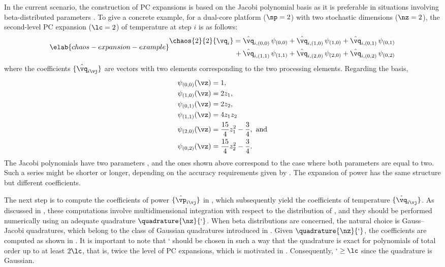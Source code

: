 In the current scenario, the construction of \ac{PC} expansions is based on the
Jacobi polynomial basis as it is preferable in situations involving
beta-distributed parameters \cite{xiu2010}. To give a concrete example, for a
dual-core platform ($\np = 2$) with two stochastic dimensions ($\nz = 2$), the
second-level \ac{PC} expansion ($\lc = 2$) of temperature at step $i$ is as
follows:
\begin{equation} \elab{chaos-expansion-example}
  \begin{split}
    \chaos{2}{2}{\vq_i}
    =    {} & \hat{\vq}_{i, (0, 0)} \, \psi_{(0, 0)} +
              \hat{\vq}_{i, (1, 0)} \, \psi_{(1, 0)} +
              \hat{\vq}_{i, (0, 1)} \, \psi_{(0, 1)} \\
    {} + {} & \hat{\vq}_{i, (1, 1)} \, \psi_{(1, 1)} +
              \hat{\vq}_{i, (2, 0)} \, \psi_{(2, 0)} +
              \hat{\vq}_{i, (0, 2)} \, \psi_{(0, 2)}
  \end{split}
\end{equation}
where the coefficients $\{ \hat{\vq}_{i \vj} \}$ are vectors with two elements
corresponding to the two processing elements. Regarding the basis,
\begin{align*}
  & \psi_{(0, 0)}(\vz) = 1, \\
  & \psi_{(1, 0)}(\vz) = 2 z_1, \\
  & \psi_{(0, 1)}(\vz) = 2 z_2, \\
  & \psi_{(1, 1)}(\vz) = 4 z_1 z_2 \\
  & \psi_{(2, 0)}(\vz) = \frac{15}{4} z_1^2 - \frac{3}{4}, \text{ and} \\
  & \psi_{(0, 2)}(\vz) = \frac{15}{4} z_2^2 - \frac{3}{4}.
\end{align*}
The Jacobi polynomials have two parameters \cite{xiu2010}, and the ones shown
above correspond to the case where both parameters are equal to two. Such a
series might be shorter or longer, depending on the accuracy requirements given
by \lc. The expansion of power has the same structure but different
coefficients.

The next step is to compute the coefficients of power $\{ \hat{\vp}_{i \vj} \}$
in , which subsequently yield the coefficients of
temperature $\{ \hat{\vq}_{i \vj} \}$. As discussed in
, these computations involve multidimensional
integration with respect to the distribution of \vz, and they should be
performed numerically using an adequate quadrature $\quadrature{\nz}{\lq}$. When
beta distributions are concerned, the natural choice is Gauss--Jacobi
quadratures, which belong to the class of Gaussian quadratures introduced in
. Given $\quadrature{\nz}{\lq}$, the coefficients are
computed as shown in . It is important to note that \lq
should be chosen in such a way that the quadrature is exact for polynomials of
total order up to at least $2 \lc$, that is, twice the level of \ac{PC}
expansions, which is motivated in . Consequently, $\lq
\geq \lc$ since the quadrature is Gaussian.

